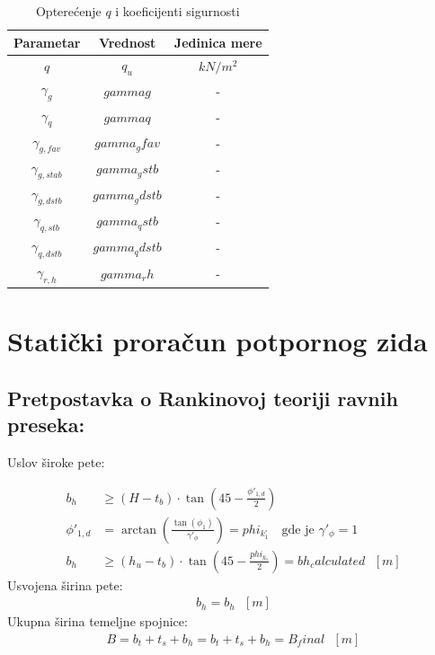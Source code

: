 \documentclass[a4paper, 11pt]{article}
\begin{document}


\begin{table}[h]
\centering
\begin{tabular}{|c|c|c|}
\hline
Parametar & Vrednost & Jedinica mere \\
\hline
$q$ & $ q_u $ & $kN/m^2$ \\
\hline
$\gamma_{g}$ & $ gammag $ & - \\
\hline
$\gamma_{q}$ & $ gammaq $ & - \\
\hline
$\gamma_{g, fav}$ & $ gamma_gfav $ & - \\
\hline
$\gamma_{g, stab}$ & $ gamma_gstb $ & - \\
\hline
$\gamma_{g, dstb}$ & $ gamma_gdstb $ & - \\
\hline
$\gamma_{q, stb}$ & $ gamma_qstb $ & - \\
\hline
$\gamma_{q, dstb}$ & $ gamma_qdstb $ & - \\
\hline
$\gamma_{r,h}$ & $ gamma_rh $ & - \\
\hline
\end{tabular}
\caption{Optere\'cenje $q$ i koeficijenti sigurnosti}
\label{tab:koeficijenti_sigurnosti}
\end{table}

\newpage

\section*{Stati\v{c}ki prora\v{c}un potpornog zida}

\subsection*{Pretpostavka o Rankinovoj teoriji ravnih preseka:}

\noindent Uslov \v{s}iroke pete:

\begin{align*}
b_{h} &\geq (H - t_{b}) \cdot \tan\left(45 - \frac{\phi'_{1,d}}{2}\right)\\
\phi'_{1,d} &= \arctan\left(\frac{\tan(\phi_{1})}{\gamma'_{\phi}}\right) = phi_k_1^\circ \quad \text{gde je } \gamma'_{\phi} = 1\\
b_{h} &\geq (h_u - t_b) \cdot \tan\left(45 - \frac{phi_k_1}{2}\right) = bh_calculated \text{ } [m]
\end{align*}
Usvojena \v{s}irina pete:
\begin{align*}
b_{h} = b_h \text{ } [m]
\end{align*}
Ukupna \v{s}irina temeljne spojnice:
\begin{align*}
B = b_{t} + t_{s} + b_{h} = b_t + t_s + b_h = B_final \text{ } [m]
\end{align*}
\end{document}
